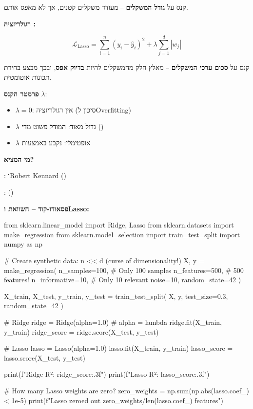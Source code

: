 קנס על \textbf{גודל המשקלים} – מעודד משקלים קטנים, אך לא מאפס אותם.

\textbf{רגולריזציה :}

\begin{equation}
\mathcal{L}_{\text{Lasso}} = \sum_{i=1}^{n} (y_i - \hat{y}_i)^2 + \lambda \sum_{j=1}^{d} |w_j|
\end{equation}

קנס על \textbf{סכום ערכי המשקלים} – מאלץ חלק מהמשקלים להיות \textbf{בדיוק אפס}, ובכך מבצע בחירת תכונות אוטומטית.

\textbf{פרמטר הקנס} $\lambda$:
\begin{itemize}
\item $\lambda = \num{0}$: אין רגולריזציה (סיכון ל\en{-}Overfitting)
\item $\lambda$ גדול מאוד: המודל פשוט מדי ()
\item $\lambda$ אופטימלי: נקבע באמצעות 
\end{itemize}

\textbf{מי המציא?}

:  ו\en{-}Robert Kennard () \cite{hoerl1970}

:  () \cite{tibshirani1996}

\textbf{פסאודו-קוד – השוואת  ו\en{-}Lasso:}

\begin{pythonbox}
from sklearn.linear_model import Ridge, Lasso
from sklearn.datasets import make_regression
from sklearn.model_selection import train_test_split
import numpy as np

# Create synthetic data: n << d (curse of dimensionality!)
X, y = make_regression(
    n_samples=100,      # Only 100 samples
    n_features=500,     # 500 features!
    n_informative=10,   # Only 10 relevant
    noise=10,
    random_state=42
)

X_train, X_test, y_train, y_test = train_test_split(
    X, y, test_size=0.3, random_state=42
)

# Ridge
ridge = Ridge(alpha=1.0)  # alpha = lambda
ridge.fit(X_train, y_train)
ridge_score = ridge.score(X_test, y_test)

# Lasso
lasso = Lasso(alpha=1.0)
lasso.fit(X_train, y_train)
lasso_score = lasso.score(X_test, y_test)

print(f"Ridge R²: {ridge_score:.3f}")
print(f"Lasso R²: {lasso_score:.3f}")

# How many Lasso weights are zero?
zero_weights = np.sum(np.abs(lasso.coef_) < 1e-5)
print(f"Lasso zeroed out {zero_weights}/{len(lasso.coef_)} features")
\end{pythonbox}

